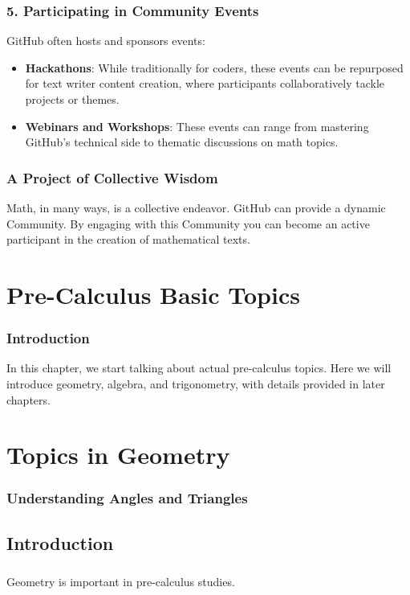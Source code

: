 \documentclass[a4paper,12pt]{book}
\begin{document}
\subsection*{5. Participating in Community Events}
GitHub often hosts and sponsors events:

\begin{itemize}
    \item \textbf{Hackathons}: While traditionally for coders, these events can be repurposed for text writer content creation, where participants collaboratively tackle projects or themes.
    \item \textbf{Webinars and Workshops}: These events can range from mastering GitHub's technical side to thematic discussions on math topics.
\end{itemize}

\subsection*{A Project of Collective Wisdom}
Math, in many ways, is a collective endeavor. GitHub can provide a dynamic Community. By engaging with this Community you can become an active participant in the creation of mathematical texts.

\chapter{Pre-Calculus Basic Topics}
\subsection*{Introduction}
In this chapter, we start talking about actual pre-calculus topics. Here we will introduce geometry, algebra, and trigonometry, with details provided in later chapters.

\chapter{Topics in Geometry}
\subsection*{Understanding Angles and Triangles}

\section*{Introduction}
\paragraph{}
Geometry is important in pre-calculus studies.
\end{document}
